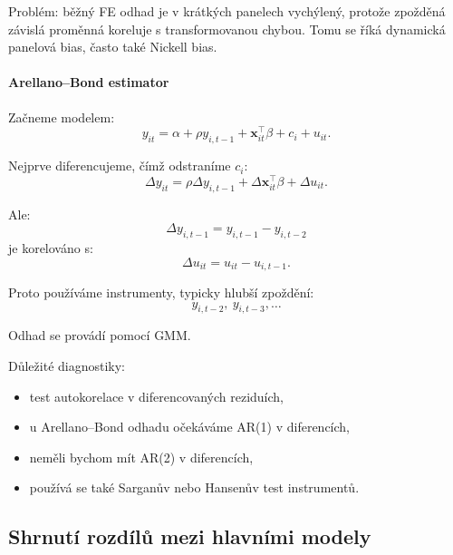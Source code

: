 Problém: běžný FE odhad je v krátkých panelech vychýlený, protože zpožděná závislá proměnná
koreluje s transformovanou chybou. Tomu se říká dynamická panelová bias, často také Nickell bias.

\paragraph{Arellano--Bond estimator}

Začneme modelem:
\[
    y_{it}
    =
    \alpha
    +
    \rho y_{i,t-1}
    +
    \mathbf x_{it}^\top\beta
    +
    c_i
    +
    u_{it}.
\]

Nejprve diferencujeme, čímž odstraníme $c_i$:
\[
    \Delta y_{it}
    =
    \rho \Delta y_{i,t-1}
    +
    \Delta \mathbf x_{it}^\top\beta
    +
    \Delta u_{it}.
\]

Ale:
\[
    \Delta y_{i,t-1}=y_{i,t-1}-y_{i,t-2}
\]
je korelováno s:
\[
    \Delta u_{it}=u_{it}-u_{i,t-1}.
\]

Proto používáme instrumenty, typicky hlubší zpoždění:
\[
    y_{i,t-2},\ y_{i,t-3},\dots
\]

Odhad se provádí pomocí GMM.

Důležité diagnostiky:
\begin{itemize}
    \item test autokorelace v diferencovaných reziduích,
    \item u Arellano--Bond odhadu očekáváme AR(1) v diferencích,
    \item neměli bychom mít AR(2) v diferencích,
    \item používá se také Sarganův nebo Hansenův test instrumentů.
\end{itemize}

\subsection{Shrnutí rozdílů mezi hlavními modely}

